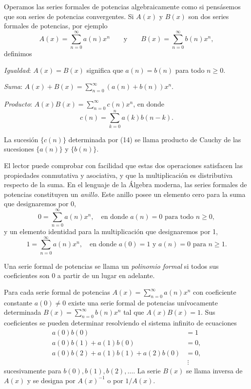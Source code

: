 \documentclass[12pt,a4paper]{book}
\begin{document}
    Operamos las series formales de potencias algebraicamente como si pensásemos que son
    series de potencias convergentes. Si $A(x)$ y $B(x)$ son dos series formales de
    potencias, por ejemplo
    \begin{equation*}
        A(x)=\sum_{n=0}^{\infty}a(n)x^n\qquad\text{y}\qquad B(x)=\sum_{n=0}^{\infty}b(n)x^n,
    \end{equation*}
    definimos

    \textit{Igualdad}: $A(x)=B(x)$ significa que $a(n)=b(n)$ para todo $n\geq0$.

    \textit{Suma}: $A(x)+B(x)=\sum_{n=0}^{\infty}(a(n)+b(n))x^n$.

    \textit{Producto}: $A(x)B(x)=\sum_{n=0}^{\infty}c(n)x^n$, en donde
    \begin{equation}
        c(n)=\sum_{k=0}^{n}a(k)b(n-k).
    \end{equation}

    La sucesión $\{c(n)\}$ determinada por (14) se llama producto de Cauchy de las
    sucesiones $\{a(n)\}$ y $\{b(n)\}$.

    El lector puede comprobar con facilidad que estas dos operaciones satisfacen las
    propiedades conmutativa y asociativa, y que la multiplicación es distributiva respecto
    de la suma. En el lenguaje de la Álgebra moderna, las series formales de potencias
    constituyen un \textit{anillo}. Este anillo posee un elemento cero para la suma que
    designaremos por 0,
    \begin{equation*}
        0=\sum_{n=0}^{\infty}a(n)x^n,\quad\text{en donde } a(n)=0 \text{ para todo } n\geq0,
    \end{equation*}
    y un elemento identidad para la multiplicación que designaremos por 1,
    \begin{equation*}
        1=\sum_{n=0}^{\infty}a(n)x^n,\quad\text{en donde } a(0)=1 \text{ y } a(n)=0
        \text{ para } n\geq1.
    \end{equation*}

    Una serie formal de potencias se llama un \textit{polinomio formal} si todos sus
    coeficientes son 0 a partir de un lugar en adelante.

    Para cada serie formal de potencias $A(x)=\sum_{n=0}^{\infty}a(n)x^n$ con coeficiente
    constante $a(0)\neq0$ existe una serie formal de potencias unívocamente determinada
    $B(x)=\sum_{n=0}^{\infty}b(n)x^n$ tal que $A(x)B(x)=1$. Sus coeficientes se pueden
    determinar resolviendo el sistema infinito de ecuaciones
    \begin{align*}
        a(0)b(0)&=1\\
        a(0)b(1)+a(1)b(0)&=0,\\
        a(0)b(2)+a(1)b(1)+a(2)b(0)&=0,\\
        &\ \vdots
    \end{align*}
    sucesivamente para $b(0),b(1),b(2),\dots$. La serie $B(x)$ se llama inversa de $A(x)$
    y se designa por $A(x)^{-1}$ o por $1/A(x)$.
\end{document}
